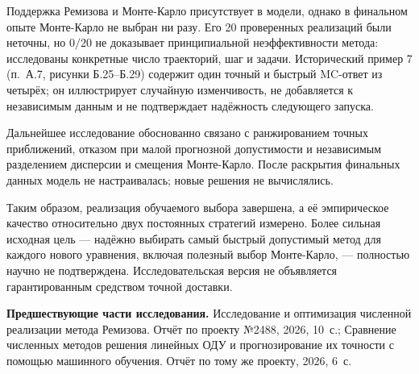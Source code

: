 Поддержка Ремизова и Монте-Карло присутствует в модели, однако в финальном опыте Монте-Карло не выбран ни разу. Его 20 проверенных реализаций были неточны, но $0/20$ не доказывает принципиальной неэффективности метода: исследованы конкретные число траекторий, шаг и задачи. Исторический пример 7 (п.~А.7, рисунки Б.25--Б.29) содержит один точный и быстрый MC-ответ из четырёх; он иллюстрирует случайную изменчивость, не добавляется к независимым данным и не подтверждает надёжность следующего запуска.

Дальнейшее исследование обоснованно связано с ранжированием точных приближений, отказом при малой прогнозной допустимости и независимым разделением дисперсии и смещения Монте-Карло. После раскрытия финальных данных модель не настраивалась; новые решения не вычислялись.

Таким образом, реализация обучаемого выбора завершена, а её эмпирическое качество относительно двух постоянных стратегий измерено. Более сильная исходная цель --- надёжно выбирать самый быстрый допустимый метод для каждого нового уравнения, включая полезный выбор Монте-Карло, --- полностью научно не подтверждена. Исследовательская версия не объявляется гарантированным средством точной доставки.

\vspace{4pt}\noindent\textbf{Предшествующие части исследования.} Исследование и оптимизация численной реализации метода Ремизова. Отчёт по проекту №2488, 2026, 10~с.; Сравнение численных методов решения линейных ОДУ и прогнозирование их точности с помощью машинного обучения. Отчёт по тому же проекту, 2026, 6~с.
